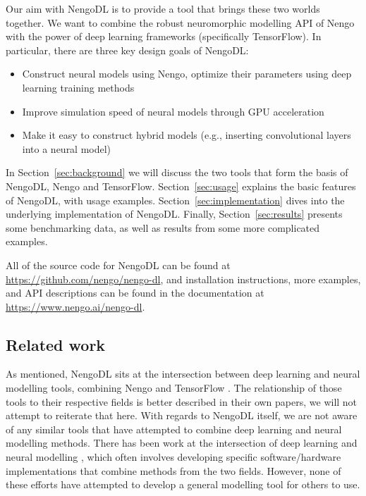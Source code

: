\documentclass{article}
\begin{document}
Our aim with NengoDL is to provide a tool that brings these two worlds together.  We want to combine the robust neuromorphic modelling API of Nengo with the power of deep learning frameworks (specifically TensorFlow).  In particular, there are three key design goals of NengoDL:

\begin{itemize}
\item Construct neural models using Nengo, optimize their parameters using deep learning training methods
\item Improve simulation speed of neural models through GPU acceleration
\item Make it easy to construct hybrid models (e.g., inserting convolutional layers into a neural model)
\end{itemize}

In Section~\ref{sec:background} we will discuss the two tools that form the basis of NengoDL, Nengo and TensorFlow.  Section~\ref{sec:usage} explains the basic features of NengoDL, with usage examples.  Section~\ref{sec:implementation} dives into the underlying implementation of NengoDL.  Finally, Section~\ref{sec:results} presents some benchmarking data, as well as results from some more complicated examples.

All of the source code for NengoDL can be found at \url{https://github.com/nengo/nengo-dl}, and installation instructions, more examples, and API descriptions can be found in the documentation at \url{https://www.nengo.ai/nengo-dl}.

\subsection{Related work}

As mentioned, NengoDL sits at the intersection between deep learning and neural modelling tools, combining Nengo \citep{Bekolay2014} and TensorFlow \citep{Abaddi2016}.  The relationship of those tools to their respective fields is better described in their own papers, we will not attempt to reiterate that here.  With regards to NengoDL itself, we are not aware of any similar tools that have attempted to combine deep learning and neural modelling methods.  There has been work at the intersection of deep learning and neural modelling \citep[e.g.,][]{Esser2015,Hunsberger2015,Kriegeskorte2015,Yamins2016,Lee2016}, which often involves developing specific software/hardware implementations that combine methods from the two fields. However, none of these efforts have attempted to develop a general modelling tool for others to use.
\end{document}
